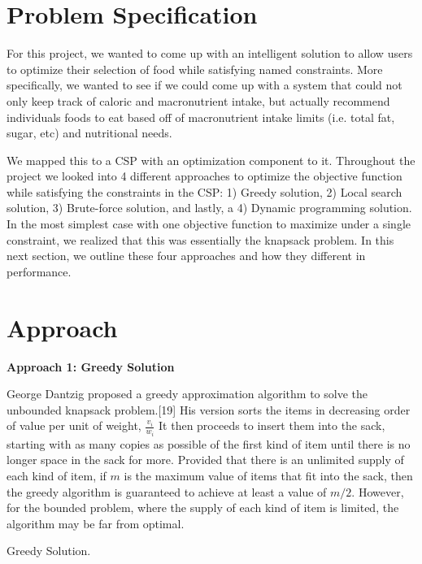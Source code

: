 \documentclass[11pt]{article}
\begin{document}
\section{Problem Specification}
For this project, we wanted to come up with an intelligent solution to allow users to optimize their selection of food while satisfying named constraints. More specifically, we wanted to see if we could come up with a system that could not only keep track of caloric and macronutrient intake, but actually recommend individuals foods to eat based off of macronutrient intake limits (i.e. total fat, sugar, etc) and nutritional needs. \par
\vspace{2mm}
\noindent We mapped this to a CSP with an optimization component to it. Throughout the project we looked into 4 different approaches to optimize the objective function while satisfying the constraints in the CSP: 1) Greedy solution, 2) Local search solution, 3) Brute-force solution, and lastly, a 4) Dynamic programming solution. In the most simplest case with one objective function to maximize under a single constraint, we realized that this was essentially the knapsack problem. In this next section, we outline these four approaches and how they different in performance.


\section{Approach}

\textbf{Approach 1: Greedy Solution}

\noindent George Dantzig proposed a greedy approximation algorithm to solve the unbounded knapsack problem.[19] His version sorts the items in decreasing order of value per unit of weight, $\frac{ v_{i}}{w_{i}}$ It then proceeds to insert them into the sack, starting with as many copies as possible of the first kind of item until there is no longer space in the sack for more. Provided that there is an unlimited supply of each kind of item, if $m$ is the maximum value of items that fit into the sack, then the greedy algorithm is guaranteed to achieve at least a value of $m/2$. However, for the bounded problem, where the supply of each kind of item is limited, the algorithm may be far from optimal. 

\begin{algorithm}
  \begin{algorithmic}
    \ENDWHILE  
    \EndProcedure{}
  \end{algorithmic}
  \caption{Greedy Solution.}
\end{algorithm}
\end{document}
